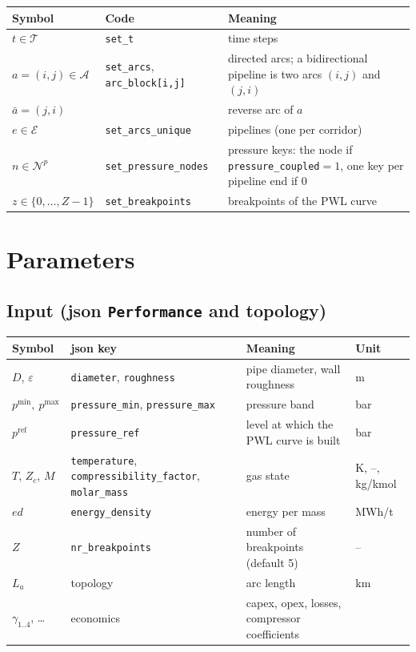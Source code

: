 \documentclass[11pt,a4paper]{article}
\newcommand{\code}[1]{\texttt{#1}}
\newcommand{\pmin}{p^{\min}}
\newcommand{\pmax}{p^{\max}}
\newcommand{\pref}{p^{\mathrm{ref}}}
\newcommand{\abar}{\bar a}
\begin{document}
\begin{tabularx}{\linewidth}{@{}l l X@{}}
\toprule
Symbol & Code & Meaning \\
\midrule
$t\in\mathcal T$ & \code{set\_t} & time steps \\
$a=(i,j)\in\mathcal A$ & \code{set\_arcs}, \code{arc\_block[i,j]} &
  directed arcs; a bidirectional pipeline is two arcs $(i,j)$ and $(j,i)$ \\
$\abar=(j,i)$ & & reverse arc of $a$ \\
$e\in\mathcal E$ & \code{set\_arcs\_unique} & pipelines (one per corridor) \\
$n\in\mathcal N^p$ & \code{set\_pressure\_nodes} &
  pressure keys: the node if \code{pressure\_coupled}$=1$, one key per pipeline end if $0$ \\
$z\in\{0,\dots,Z-1\}$ & \code{set\_breakpoints} & breakpoints of the PWL curve \\
\bottomrule
\end{tabularx}

\section{Parameters}

\subsection{Input (json \code{Performance} and topology)}

\begin{tabularx}{\linewidth}{@{}l l X l@{}}
\toprule
Symbol & json key & Meaning & Unit \\
\midrule
$D$, $\varepsilon$ & \code{diameter}, \code{roughness} & pipe diameter, wall roughness & m \\
$\pmin,\ \pmax$ & \code{pressure\_min}, \code{pressure\_max} & pressure band & bar \\
$\pref$ & \code{pressure\_ref} & level at which the PWL curve is built & bar \\
$T$, $Z_c$, $M$ & \code{temperature}, \code{compressibility\_factor}, \code{molar\_mass}
  & gas state & K, --, kg/kmol \\
$ed$ & \code{energy\_density} & energy per mass & MWh/t \\
$Z$ & \code{nr\_breakpoints} & number of breakpoints (default 5) & -- \\
$L_a$ & topology & arc length & km \\
$\gamma_{1..4}$, \dots & economics & capex, opex, losses, compressor coefficients & \\
\bottomrule
\end{tabularx}
\end{document}
